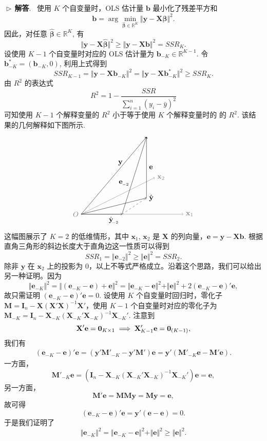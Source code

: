 \documentclass{article}
\newcommand{\y}{\mathbf{y}}
\newcommand{\X}{\mathbf{X}}
\newcommand{\M}{\mathbf{M}}
\newcommand{\e}{\mathbf{e}}
\newcommand{\0}{\mathbf{0}}
\newcommand{\vbe}{\bm{\beta}}
\newcommand{\vb}{\mathbf{b}}
\newcommand{\sol}{\noindent$\vartriangleright\,$\textbf{解答}.\ }
\begin{document}
\sol
使用 $K$ 个自变量时，OLS 估计量 $\vb$ 最小化了残差平方和
\[
\vb=\arg\min_{\hat{\vbe}\in\mathbb{R}^K}\Vert\y-\X\hat{\vbe}\Vert^2.
\]
因此，对任意 $\hat{\vbe}\in\mathbb{R}^K$, 有
\[
\Vert\y-\X\hat{\vbe}\Vert^2\ge\Vert\y-\X\vb\Vert^2=SSR_K.
\]
设使用 $K-1$ 个自变量时对应的 OLS 估计量为 $\vb_{-K}\in\mathbb{R}^{K-1}$. 令 $\vb_{-K}^*=(\vb_{-K},0)$, 利用上式得到
\[
SSR_{K-1}=\Vert\y-\X\vb_{-K}\Vert^2=\Vert\y-\X\vb_{-K}^*\Vert^2\ge SSR_K.
\]
由 $R^2$ 的表达式
\[
R^2=1-\frac{SSR}{\sum\limits_{i=1}^n(y_i-\bar{y})^2}
\]    
可知使用 $K-1$ 个解释变量的 $R^2$ 小于等于使用 $K$ 个解释变量时的 的 $R^2$. 该结果的几何解释如下图所示.
\[
\begin{tikzpicture}
\draw [color=black!50,->](0,0) node[left]{$O$}-- node [color=black!20,pos=0.25,above,sloped]{}(3.6,1.8) node[right]{$\mathbf{x}_2$};
\draw [color=black!50,->](0,0) node[left]{}-- node [color=black!20,pos=0.25,above,sloped]{}(5,0) node[right]{$\mathbf{x}_1$};
\draw [color=black,->](0,0) node[left]{}-- node [color=black,pos=0.6,above]{$\y$}(3.2,3.8) node[right]{};
\draw [color=black,->](3.2,0.8) node[left]{}-- node [color=black,pos=0.5,right]{$\e$}(3.2,3.8) node[right]{};
\draw [color=black,->](0,0) node[left]{}-- node [color=red!70,pos=0.25,above,sloped]{}(3.2,0.8) node[right]{$\hat{\y}$};
\draw [color=black,->](2,0) node[left]{}-- node [color=black,pos=0.4,left]{$\e_{\hspace{-0.5pt}_{-2}}$}(3.2,3.8) node[right]{};
\draw [color=black,->](0,0) node[left]{}-- node [color=black,pos=0.8,below]{$\hat{\y}_{\hspace{-2pt}_{-2}}$}(2,0) node[right]{};
\draw [color=black!70,-,dashed](2,0) node[left]{}-- node [color=red!70,pos=0.25,above,sloped]{}(3.2,0.8) node[right]{};
\end{tikzpicture}
\]
这幅图展示了 $K=2$ 的低维情形，其中 $\mathbf{x}_1$, $\mathbf{x}_2$ 是 $\X$ 的列向量，$\e=\y-\X\vb$. 根据直角三角形的斜边长度大于直角边这一性质可以得到
\[
SSR_{1}=\Vert\e_{-2}\Vert^2\ge\Vert\e\Vert^2= SSR_2.
\] 
除非 $\y$ 在 $\mathbf{x}_2$ 上的投影为 0，以上不等式严格成立。沿着这个思路，我们可以给出另一种证明。因为
\[
\Vert\e_{-K}\Vert^2=\Vert(\e_{-K}-\e)+\e\Vert^2=\Vert\e_{-K}-\e\Vert^2+\Vert\e\Vert^2+2(\e_{-K}-\e)'\e,
\]
故只需证明 $(\e_{-K}-\e)'\e=0$. 设使用 $K$ 个自变量时回归时，零化子 $\M=\mathbf{I}_n-\X(\X'\X)^{-1}\X'$，使用 $K-1$ 个自变量时对应的零化子为 $\M_{-K}=\mathbf{I}_{n}-\X_{-K}(\X_{-K}'\X_{-K})^{-1}\X_{-K}'$. 注意到
\[
\X'\e=\0_{K\times 1}\implies\X'_{K-1}\e=\0_{(K-1)\time 1},
\]
我们有
\begin{align*}
(\e_{-K}-\e)'\e=(\y'\M'_{-K}-\y'\M')\e=\y'(\M'_{-K}\e-\M'\e).
\end{align*}
一方面，
\[
\M'_{-K}\e=(\mathbf{I}_{n}-\X_{-K}(\X_{-K}'\X_{-K})^{-1}\X_{-K}')\e=\e,
\]
另一方面，
\[
\M'\e=\M\M\y=\M\y=\e,
\]
故可得
\[
(\e_{-K}-\e)'\e=\y'(\e-\e)=0.
\]
于是我们证明了
\[
\Vert\e_{-K}\Vert^2=\Vert\e_{-K}-\e\Vert^2+\Vert\e\Vert^2\ge\Vert\e\Vert^2.
\]
\end{document}
